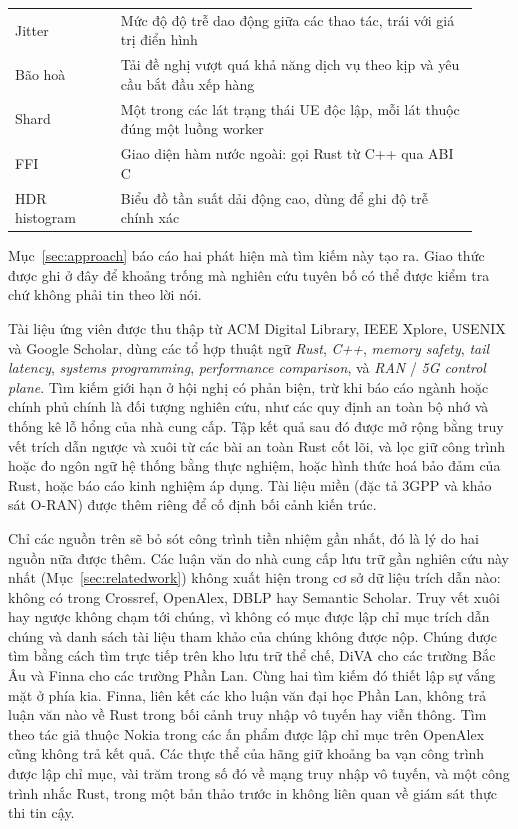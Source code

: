 \begin{table}[H]
\begin{tabular}{@{}p{0.21\linewidth} p{0.71\linewidth}@{}}
Jitter & Mức độ độ trễ dao động giữa các thao tác, trái với giá trị điển hình \\
Bão hoà & Tải đề nghị vượt quá khả năng dịch vụ theo kịp và yêu cầu bắt đầu xếp hàng \\
Shard & Một trong các lát trạng thái UE độc lập, mỗi lát thuộc đúng một luồng worker \\
FFI & Giao diện hàm nước ngoài: gọi Rust từ C++ qua ABI C \\
HDR histogram & Biểu đồ tần suất dải động cao, dùng để ghi độ trễ chính xác \\
\hline
\end{tabular}
\end{table}

Mục~\ref{sec:approach} báo cáo hai phát hiện mà tìm kiếm này tạo ra. Giao thức được ghi ở đây để
khoảng trống mà nghiên cứu tuyên bố có thể được kiểm tra chứ không phải tin theo lời nói.

Tài liệu ứng viên được thu thập từ ACM Digital Library, IEEE Xplore, USENIX và Google
Scholar, dùng các tổ hợp thuật ngữ \emph{Rust}, \emph{C++}, \emph{memory safety}, \emph{tail
latency}, \emph{systems programming}, \emph{performance comparison}, và \emph{RAN} / \emph{5G
control plane}. Tìm kiếm giới hạn ở hội nghị có phản biện, trừ khi báo cáo ngành hoặc
chính phủ chính là đối tượng nghiên cứu, như các quy định an toàn bộ nhớ và thống kê lỗ hổng của
nhà cung cấp.
Tập kết quả sau đó được mở rộng bằng truy vết trích dẫn ngược và xuôi từ các bài an toàn Rust
cốt lõi, và lọc giữ công trình hoặc đo ngôn ngữ hệ thống bằng thực nghiệm, hoặc hình thức hoá bảo
đảm của Rust, hoặc báo cáo kinh nghiệm áp dụng. Tài liệu miền (đặc tả 3GPP và
khảo sát O-RAN) được thêm riêng để cố định bối cảnh kiến trúc.

Chỉ các nguồn trên sẽ bỏ sót công trình tiền nhiệm gần nhất, đó là lý do hai nguồn nữa được thêm.
Các luận văn do nhà cung cấp lưu trữ gần nghiên cứu này nhất (Mục~\ref{sec:relatedwork}) không
xuất hiện trong cơ sở dữ liệu trích dẫn nào: không có trong Crossref, OpenAlex, DBLP hay Semantic
Scholar. Truy vết xuôi hay ngược không chạm tới chúng, vì không có mục được lập chỉ mục trích dẫn
chúng và danh sách tài liệu tham khảo của chúng không được nộp. Chúng được tìm bằng cách tìm trực
tiếp trên kho lưu trữ thể chế, DiVA cho các trường Bắc Âu và Finna cho các trường Phần Lan. Cùng hai
tìm kiếm đó thiết lập sự vắng mặt ở phía kia. Finna, liên kết các kho luận văn đại học Phần Lan,
không trả luận văn nào về Rust trong bối cảnh truy nhập vô tuyến hay viễn thông. Tìm theo tác giả
thuộc Nokia trong các ấn phẩm được lập chỉ mục trên OpenAlex cũng không trả kết quả. Các thực thể của
hãng giữ khoảng ba vạn công trình được lập chỉ mục, vài trăm trong số đó về mạng truy nhập vô tuyến,
và một công trình nhắc Rust, trong một bản thảo trước in không liên quan về giám sát thực thi tin
cậy.

